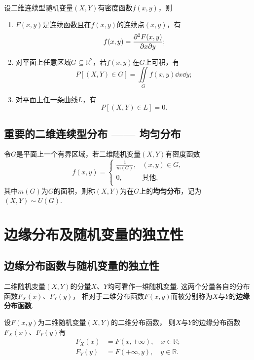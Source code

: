 \begin{theorem}
设二维连续型随机变量\((X,Y)\)有密度函数\(f(x,y)\)，则
\begin{enumerate}
\item \(F(x,y)\)是连续函数且在\(f(x,y)\)的连续点\((x,y)\)，有\[
f(x,y) = \pdv{F(x,y)}{x}{y};
\]
\item 对平面上任意区域\(G \subseteq \mathbb{R}^2\)，若\(f(x,y)\)在\(G\)上可积，有\[
P\left[(X,Y) \in G\right] = \iint\limits_G{f(x,y) \dd{x}\dd{y}};
\]
\item 对平面上任一条曲线\(L\)，有\[
P\left[(X,Y) \in L\right] = 0.
\]
\end{enumerate}
\end{theorem}

\subsection{重要的二维连续型分布 —— 均匀分布}
\begin{definition}
令\(G\)是平面上一个有界区域，若二维随机变量\((X,Y)\)有密度函数\[
f(x,y) = \left\{ \begin{array}{ll}
\frac{1}{m(G)}, & (x,y) \in G, \\
0, & \text{其他}, \\
\end{array} \right.
\]其中\(m(G)\)为\(G\)的面积，则称\((X,Y)\)为在\(G\)上的\textbf{均匀分布}，记为\((X,Y) \sim U(G)\).
\end{definition}

\section{边缘分布及随机变量的独立性}
\subsection{边缘分布函数与随机变量的独立性}
\begin{definition}
二维随机变量\((X,Y)\)的分量\(X\)、\(Y\)均可看作一维随机变量.
这两个分量各自的分布函数\(F_X(x)\)、\(F_Y(y)\)，%
相对于二维分布函数\(F(x,y)\)而被分别称为\(X\)与\(Y\)的\textbf{边缘分布函数}.
\end{definition}

\begin{theorem}
设\(F(x,y)\)为二维随机变量\((X,Y)\)的二维分布函数，%
则\(X\)与\(Y\)的边缘分布函数\(F_X(x)\)、\(F_Y(y)\)有
\begin{align*}
F_X(x) &= F(x,+\infty), \quad x \in \mathbb{R}; \\
F_Y(y) &= F(+\infty,y), \quad y \in \mathbb{R}.
\end{align*}
\end{theorem}

